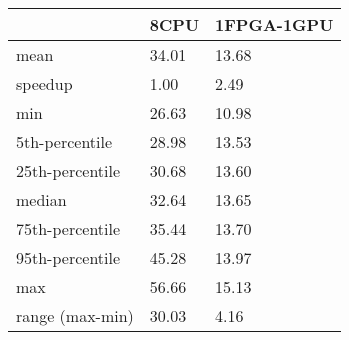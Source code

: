 \begin{tabular}{lll}
\toprule
 & 8CPU & 1FPGA-1GPU \\
\midrule
mean & 34.01 & 13.68 \\
speedup & 1.00 & 2.49 \\
min & 26.63 & 10.98 \\
5th-percentile & 28.98 & 13.53 \\
25th-percentile & 30.68 & 13.60 \\
median & 32.64 & 13.65 \\
75th-percentile & 35.44 & 13.70 \\
95th-percentile & 45.28 & 13.97 \\
max & 56.66 & 15.13 \\
range (max-min) & 30.03 & 4.16 \\
\bottomrule
\end{tabular}
